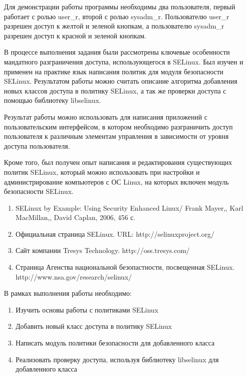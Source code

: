 \documentclass{./../class/UIR}
\begin{document}
	Для демонстрации работы программы необходимы два пользователя, первый работает
	с ролью user\_r, второй с ролью sysadm\_r. Пользователю user\_r разрешен доступ
	к желтой и зеленой кнопкам, а пользователю sysadm\_r разрешен доступ к красной
	и зеленой кнопкам.
	
	
    В процессе выполнения задания были рассмотрены ключевые особенности
    мандатного разграничения доступа, использующегося в SELinux. Был изучен и
    применен на практике язык написания политик для модуля безопасности
    SELinux. Результатом работы можно считать описание алгоритма добавления
    новых классов доступа в политику SELinux, а так же проверки доступа с
    помощью библиотеку libselinux.

    Результат работы можно использовать для написания приложений с
    пользовательским интерфейсом, в котором необходимо разграничить доступ
    пользователя к различным элементам управления в зависимости от уровня
    доступа пользователя.

    Кроме того, был получен опыт написания и редактирования существующих политик
    SELinux, который можно использовать при настройки и администрирование
    компьютеров с ОС Linux, на которых включен модуль безопасности SELinux.

    \begin{enumerate}
      \item SELinux by Example: Using Security Enhanced Linux/ Frank Mayer,,
      Karl MacMillan,, David Caplan, 2006, 456 с.
      \item Официальная страница SELinux. URL: http://selinuxproject.org/
      \item Сайт компании Tresys Technology. http://oss.tresys.com/
      \item Страница Агенства национальной безопастности, посвещенная SELinux.
      http://www.nsa.gov/research/selinux/
    \end{enumerate}


\begin{ReviewOfSupervisor}

\end{ReviewOfSupervisor} 


\begin{TaskOfStudent}
В рамках выполнения работы необходимо:
\begin{enumerate}
  \item Изучить основы работы с политиками SELinux
  \item Добавить новый класс доступа в политику SELinux
  \item Написать модуль политики безопасности для добавленного класса
  \item Реализовать проверку доступа, используя библиотеку libselinux для
  добавленного класса
\end{enumerate}
\end{TaskOfStudent}
\end{document}
